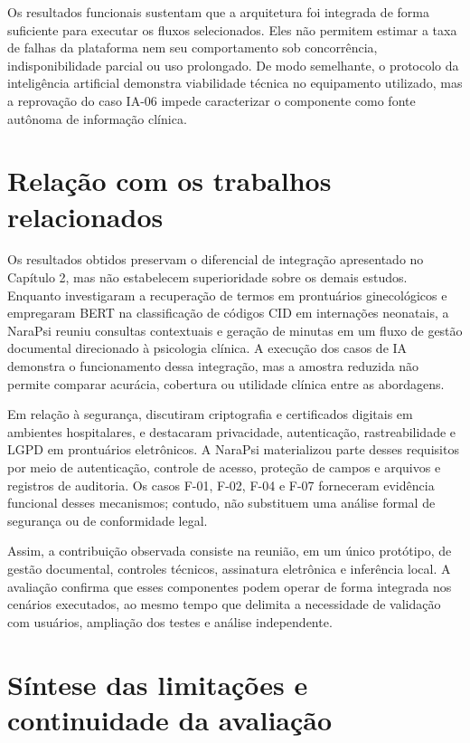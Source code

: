 Os resultados funcionais sustentam que a arquitetura foi integrada de forma suficiente para executar os fluxos selecionados. Eles não permitem estimar a taxa de falhas da plataforma nem seu comportamento sob concorrência, indisponibilidade parcial ou uso prolongado. De modo semelhante, o protocolo da inteligência artificial demonstra viabilidade técnica no equipamento utilizado, mas a reprovação do caso IA-06 impede caracterizar o componente como fonte autônoma de informação clínica.

\section{Relação com os trabalhos relacionados}

Os resultados obtidos preservam o diferencial de integração apresentado no Capítulo 2, mas não estabelecem superioridade sobre os demais estudos. Enquanto  investigaram a recuperação de termos em prontuários ginecológicos e  empregaram BERT na classificação de códigos CID em internações neonatais, a NaraPsi reuniu consultas contextuais e geração de minutas em um fluxo de gestão documental direcionado à psicologia clínica. A execução dos casos de IA demonstra o funcionamento dessa integração, mas a amostra reduzida não permite comparar acurácia, cobertura ou utilidade clínica entre as abordagens.

Em relação à segurança,  discutiram criptografia e certificados digitais em ambientes hospitalares, e  destacaram privacidade, autenticação, rastreabilidade e LGPD em prontuários eletrônicos. A NaraPsi materializou parte desses requisitos por meio de autenticação, controle de acesso, proteção de campos e arquivos e registros de auditoria. Os casos F-01, F-02, F-04 e F-07 forneceram evidência funcional desses mecanismos; contudo, não substituem uma análise formal de segurança ou de conformidade legal.

Assim, a contribuição observada consiste na reunião, em um único protótipo, de gestão documental, controles técnicos, assinatura eletrônica e inferência local. A avaliação confirma que esses componentes podem operar de forma integrada nos cenários executados, ao mesmo tempo que delimita a necessidade de validação com usuários, ampliação dos testes e análise independente.

\section{Síntese das limitações e continuidade da avaliação}

